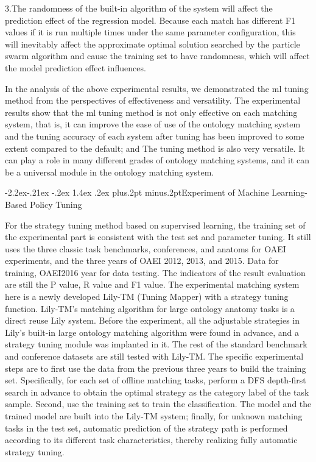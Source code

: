 \documentclass[twoside]{article}
\makeatletter
\def\subsubsection{\@startsection{subsubsection}{3}{\z@}%
 {-2.2ex\@plus -.21ex \@minus -.2ex}%
 {1.4ex \@plus.2ex}
{\normalfont\normalsize\protect\baselineskip=12pt plus.2pt minus.2pt\sl}}
\makeatother
\begin{document}
3.The randomness of the built-in algorithm of the system will affect the prediction effect of the regression model.
Because each match has different F1 values if it is run multiple times under the same parameter configuration, this will inevitably affect the approximate optimal solution searched by the particle swarm algorithm and cause the training set to have randomness, which will affect the model prediction effect influences.

In the analysis of the above experimental results, we demonstrated the ml tuning method from the perspectives of effectiveness and versatility.
The experimental results show that the ml tuning method is not only effective on each matching system, that is, it can improve the ease of use of the ontology matching system and the tuning accuracy of each system after tuning has been improved to some extent compared to the default; and The tuning method is also very versatile. It can play a role in many different grades of ontology matching systems, and it can be a universal module in the ontology matching system.

\subsubsection{Experiment of Machine Learning-Based Policy Tuning}

For the strategy tuning method based on supervised learning, the training set of the experimental part is consistent with the test set and parameter tuning. It still uses the three classic task benchmarks, conferences, and anatoms for OAEI experiments, and the three years of OAEI 2012, 2013, and 2015. Data for training, OAEI2016 year for data testing.
The indicators of the result evaluation are still the P value, R value and F1 value.
The experimental matching system here is a newly developed Lily-TM (Tuning Mapper) with a strategy tuning function.
Lily-TM's matching algorithm for large ontology anatomy tasks is a direct reuse Lily system. Before the experiment, all the adjustable strategies in Lily's built-in large ontology matching algorithm were found in advance, and a strategy tuning module was implanted in it.
The rest of the standard benchmark and conference datasets are still tested with Lily-TM.
The specific experimental steps are to first use the data from the previous three years to build the training set. Specifically, for each set of offline matching tasks, perform a DFS depth-first search in advance to obtain the optimal strategy as the category label of the task sample. Second, use the training set to train the classification. The model and the trained model are built into the Lily-TM system; finally, for unknown matching tasks in the test set, automatic prediction of the strategy path is performed according to its different task characteristics, thereby realizing fully automatic strategy tuning.
\end{document}
